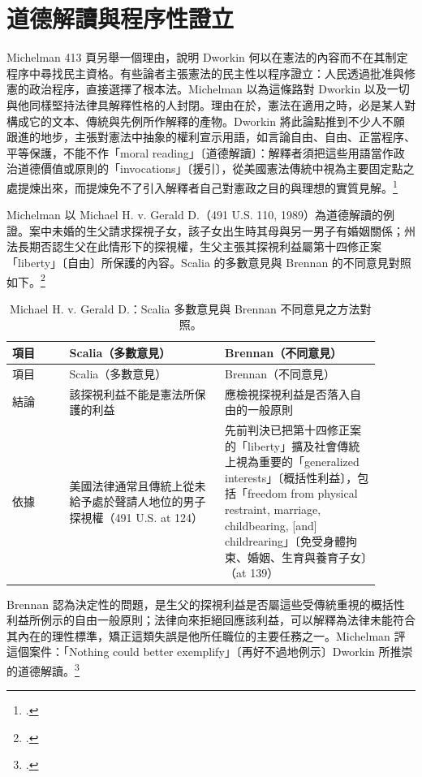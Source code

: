 \section{道德解讀與程序性證立}
\label{sec:30_dworkin-3}

Michelman 413 頁另舉一個理由，說明 Dworkin 何以在憲法的內容而不在其制定程序中尋找民主資格。有些論者主張憲法的民主性以程序證立：人民透過批准與修憲的政治程序，直接選擇了根本法。Michelman 以為這條路對 Dworkin 以及一切與他同樣堅持法律具解釋性格的人封閉。理由在於，憲法在適用之時，必是某人對構成它的文本、傳統與先例所作解釋的產物。Dworkin 將此論點推到不少人不願跟進的地步，主張對憲法中抽象的權利宣示用語，如言論自由、自由、正當程序、平等保護，不能不作「moral reading」〔道德解讀〕：解釋者須把這些用語當作政治道德價值或原則的「invocations」〔援引〕，從美國憲法傳統中視為主要固定點之處提煉出來，而提煉免不了引入解釋者自己對憲政之目的與理想的實質見解。\footcite[413--414 \& nn.45--46]{michelman1998}

Michelman 以 Michael H. v. Gerald D.（491 U.S. 110, 1989）為道德解讀的例證。案中未婚的生父請求探視子女，該子女出生時其母與另一男子有婚姻關係；州法長期否認生父在此情形下的探視權，生父主張其探視利益屬第十四修正案「liberty」〔自由〕所保護的內容。Scalia 的多數意見與 Brennan 的不同意見對照如下。\footcite[414]{michelman1998}

\begin{longtable}{@{}L{0.14\linewidth}L{0.38\linewidth}L{0.38\linewidth}@{}}
\caption{Michael H. v. Gerald D.：Scalia 多數意見與 Brennan 不同意見之方法對照。}\\
\toprule
項目 & Scalia（多數意見） & Brennan（不同意見） \\
\midrule
\endfirsthead
\toprule
項目 & Scalia（多數意見） & Brennan（不同意見） \\
\midrule
\endhead
結論 & 該探視利益不能是憲法所保護的利益 & 應檢視探視利益是否落入自由的一般原則 \\
依據 & 美國法律通常且傳統上從未給予處於聲請人地位的男子探視權（491 U.S. at 124） & 先前判決已把第十四修正案的「liberty」擴及社會傳統上視為重要的「generalized interests」〔概括性利益〕，包括「freedom from physical restraint, marriage, childbearing, [and] childrearing」〔免受身體拘束、婚姻、生育與養育子女〕（at 139） \\
\bottomrule
\end{longtable}

Brennan 認為決定性的問題，是生父的探視利益是否屬這些受傳統重視的概括性利益所例示的自由一般原則；法律向來拒絕回應該利益，可以解釋為法律未能符合其內在的理性標準，矯正這類失誤是他所任職位的主要任務之一。Michelman 評這個案件：「Nothing could better exemplify」〔再好不過地例示〕Dworkin 所推崇的道德解讀。\footcite[414]{michelman1998}

